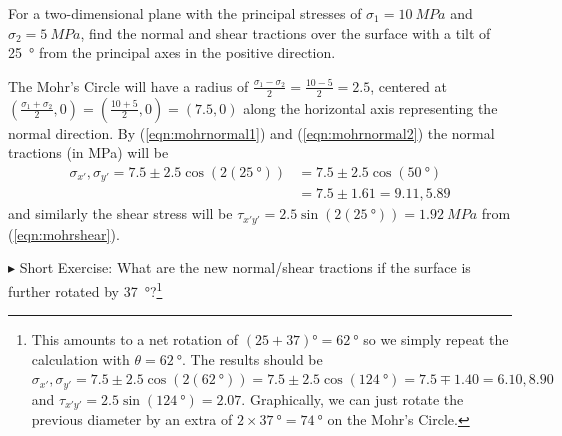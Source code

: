\begin{exmp}
For a two-dimensional plane with the principal stresses of $\sigma_1 = \SI{10}{MPa}$ and $\sigma_2 = \SI{5}{MPa}$, find the normal and shear tractions over the surface with a tilt of \SI{25}{\degree} from the principal axes in the positive direction.
\end{exmp}
\begin{solution}
The Mohr's Circle will have a radius of $\frac{\sigma_1 - \sigma_2}{2} = \frac{10-5}{2} = 2.5$, centered at $(\frac{\sigma_1 + \sigma_2}{2}, 0) = (\frac{10 + 5}{2}, 0) = (7.5,0)$ along the horizontal axis representing the normal direction. By (\ref{eqn:mohrnormal1}) and (\ref{eqn:mohrnormal2}) the normal tractions (in \si{MPa}) will be
\begin{align*}
\sigma_{x'}, \sigma_{y'} = 7.5 \pm 2.5 \cos(2(\SI{25}{\degree})) &= 7.5 \pm 2.5 \cos(\SI{50}{\degree}) \\
&= 7.5 \pm 1.61 = 9.11, 5.89
\end{align*}
and similarly the shear stress will be $\tau_{x'y'} = 2.5\sin(2(\SI{25}{\degree})) = \SI{1.92}{MPa}$ from (\ref{eqn:mohrshear}).
\end{solution}
$\blacktriangleright$ Short Exercise: What are the new normal/shear tractions if the surface is further rotated by \SI{37}{\degree}?\footnote{This amounts to a net rotation of $(25+37)\si{\degree}= \SI{62}{\degree}$ so we simply repeat the calculation with $\theta = \SI{62}{\degree}$. The results should be $\sigma_{x'}, \sigma_{y'} = 7.5 \pm 2.5 \cos(2(\SI{62}{\degree})) = 7.5 \pm 2.5 \cos(\SI{124}{\degree}) = 7.5 \mp 1.40 = 6.10, 8.90$ and $\tau_{x'y'} = 2.5\sin(\SI{124}{\degree}) = 2.07$. Graphically, we can just rotate the previous diameter by an extra of $2 \times \SI{37}{\degree} = \SI{74}{\degree}$ on the Mohr's Circle.}

